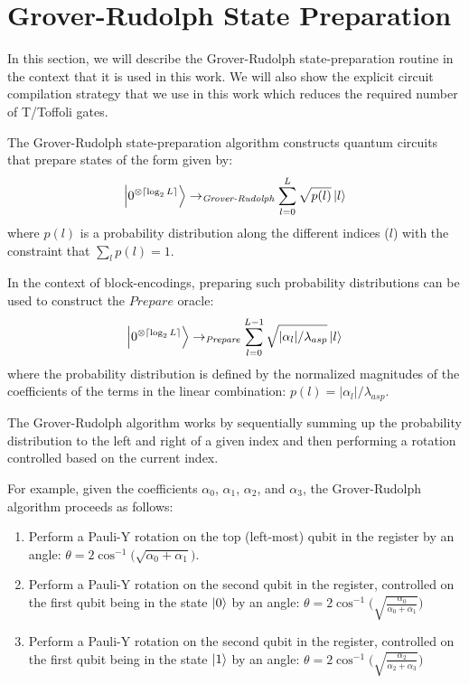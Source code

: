 \section{Grover-Rudolph State Preparation}
\label{sec:grover-rudolph}

In this section, we will describe the Grover-Rudolph state-preparation routine \cite{grover2002creating} in the context that it is used in this work.
We will also show the explicit circuit compilation strategy that we use in this work which reduces the required number of T/Toffoli gates.

The Grover-Rudolph state-preparation algorithm constructs quantum circuits that prepare states of the form given by:
\begin{equation}
    \ket{0^{\otimes \lceil \log_2{L} \rceil}} \rightarrow_{\textit{Grover-Rudolph}} \sum_{l=0}^L \sqrt{p(l)} \ket{l}
\end{equation}
where $p(l)$ is a probability distribution along the different indices ($l$) with the constraint that $\sum_l p(l) = 1$.

In the context of block-encodings, preparing such probability distributions can be used to construct the $Prepare$ oracle:
\begin{equation}
    \ket{0^{\otimes \lceil \log_2{L} \rceil}} \rightarrow_{\textit{Prepare}} \sum_{l = 0}^{L-1} \sqrt{|\alpha_l| / \lambda_{asp}} \ket{l}
\end{equation}
where the probability distribution is defined by the normalized magnitudes of the coefficients of the terms in the linear combination: $p(l) = |\alpha_l| / \lambda_{asp}$.

The Grover-Rudolph algorithm works by sequentially summing up the probability distribution to the left and right of a given index and then performing a rotation controlled based on the current index.

For example, given the coefficients $\alpha_0$, $\alpha_1$, $\alpha_2$, and $\alpha_3$, the Grover-Rudolph algorithm proceeds as follows:
\begin{enumerate}
    \item Perform a Pauli-Y rotation on the top (left-most) qubit in the register by an angle: $\theta = 2 \cos^{-1}\big( \sqrt{\alpha_0 + \alpha_1} \big)$.
    \item Perform a Pauli-Y rotation on the second qubit in the register, controlled on the first qubit being in the state $\ket{0}$ by an angle: $\theta = 2 \cos^{-1}\big( \sqrt{\frac{\alpha_0}{\alpha_0 + \alpha_1}} \big)$
    \item Perform a Pauli-Y rotation on the second qubit in the register, controlled on the first qubit being in the state $\ket{1}$ by an angle: $\theta = 2 \cos^{-1}\big( \sqrt{\frac{\alpha_2}{\alpha_2 + \alpha_3}} \big)$
\end{enumerate}

